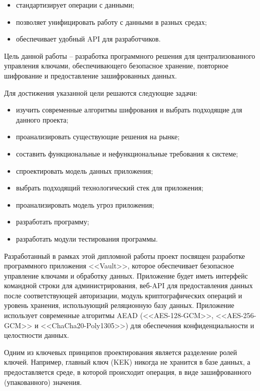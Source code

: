\documentclass[14pt, a4paper]{extarticle}
\begin{document}
	\begin{itemize}
	\item стандартизирует операции с данными;
	\item позволяет унифицировать работу с данными в разных средах;
	\item обеспечивает удобный API для разработчиков.
	\end{itemize}

	Цель данной работы -- разработка программного решения для централизованного управления ключами, обеспечивающего безопасное хранение, повторное шифрование и предоставление зашифрованных данных.
		
	Для достижения указанной цели решаются следующие задачи:
	
	\begin{itemize}
		\item изучить современные алгоритмы шифрования и выбрать подходящие для данного проекта;
		\item проанализировать существующие решения на рынке;
		\item составить функциональные и нефункциональные требования к системе;
		\item спроектировать модель данных приложения;
		\item выбрать подходящий технологический стек для приложения;
		\item проанализировать модель угроз приложения;
		\item разработать программу;
		\item разработать модули тестирования программы.
	\end{itemize}
	
	Разработанный в рамках этой дипломной работы проект посвящен разработке программного приложения <<Vault>>, которое обеспечивает безопасное управление ключами и обработку данных. Приложение будет иметь интерфейс командной строки для администрирования, веб-API для предоставления данных после соответствующей авторизации, модуль криптографических операций и уровень хранения, использующий реляционную базу данных. Приложение использует современные алгоритмы AEAD (<<AES-128-GCM>>, <<AES-256-GCM>> и <<ChaCha20-Poly1305>>) для обеспечения конфиденциальности и целостности данных. 
	
	Одним из ключевых принципов проектирования является разделение ролей ключей. Например, главный ключ (KEK) никогда не хранится в базе данных, а предоставляется среде, в которой происходит операция, в виде зашифрованного (упакованного) значения. 
	
\end{document}
